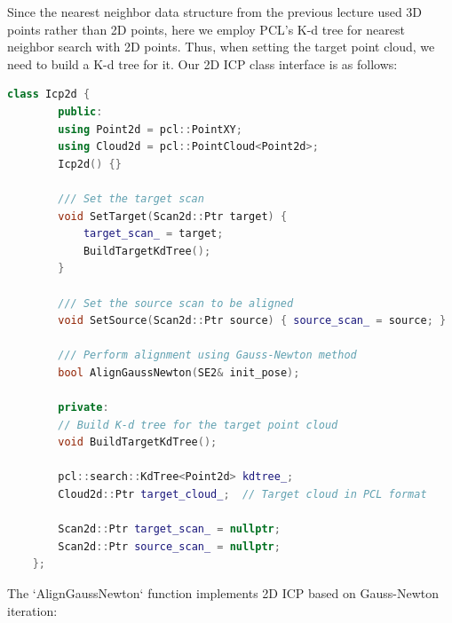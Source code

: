 Since the nearest neighbor data structure from the previous lecture used 3D points rather than 2D points, here we employ PCL's K-d tree for nearest neighbor search with 2D points. Thus, when setting the target point cloud, we need to build a K-d tree for it. Our 2D ICP class interface is as follows:  

\begin{lstlisting}[language=c++,caption=src/ch6/icp\_2d.h]  
	class Icp2d {  
		public:  
		using Point2d = pcl::PointXY;  
		using Cloud2d = pcl::PointCloud<Point2d>;  
		Icp2d() {}  
		
		/// Set the target scan  
		void SetTarget(Scan2d::Ptr target) {  
			target_scan_ = target;  
			BuildTargetKdTree();  
		}  
		
		/// Set the source scan to be aligned  
		void SetSource(Scan2d::Ptr source) { source_scan_ = source; }  
		
		/// Perform alignment using Gauss-Newton method  
		bool AlignGaussNewton(SE2& init_pose);  
		
		private:  
		// Build K-d tree for the target point cloud  
		void BuildTargetKdTree();  
		
		pcl::search::KdTree<Point2d> kdtree_;  
		Cloud2d::Ptr target_cloud_;  // Target cloud in PCL format  
		
		Scan2d::Ptr target_scan_ = nullptr;  
		Scan2d::Ptr source_scan_ = nullptr;  
	};  
\end{lstlisting}  

The `AlignGaussNewton` function implements 2D ICP based on Gauss-Newton iteration:  

